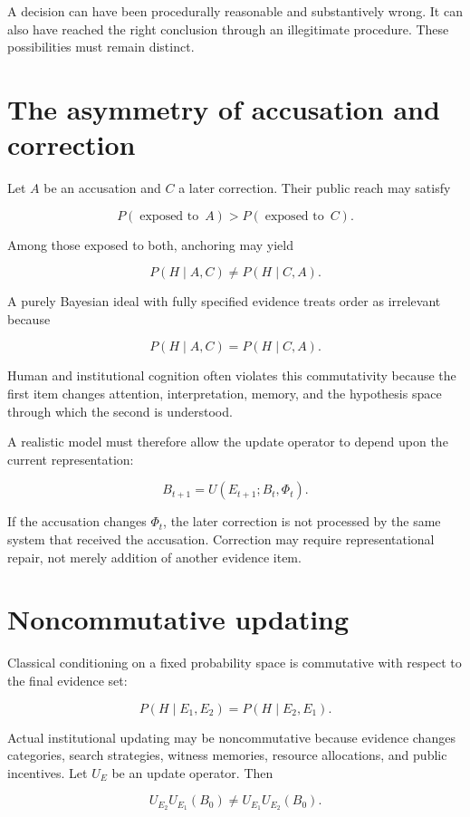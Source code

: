 A decision can have been procedurally reasonable and substantively wrong. It can also have reached the right conclusion through an illegitimate procedure. These possibilities must remain distinct.

\section{The asymmetry of accusation and correction}
\label{sec:a60}

Let \(A\) be an accusation and \(C\) a later correction. Their public reach may satisfy

\[
P(\operatorname{exposed\ to}\ A)
>
P(\operatorname{exposed\ to}\ C).
\]

Among those exposed to both, anchoring may yield

\[
P(H\mid A,C)
\neq
P(H\mid C,A).
\]

A purely Bayesian ideal with fully specified evidence treats order as irrelevant because

\[
P(H\mid A,C)
=
P(H\mid C,A).
\]

Human and institutional cognition often violates this commutativity because the first item changes attention, interpretation, memory, and the hypothesis space through which the second is understood.

A realistic model must therefore allow the update operator to depend upon the current representation:

\[
B_{t+1}
=
U(E_{t+1};B_t,\Phi_t).
\]

If the accusation changes \(\Phi_t\), the later correction is not processed by the same system that received the accusation. Correction may require representational repair, not merely addition of another evidence item.

\section{Noncommutative updating}
\label{sec:a61}

Classical conditioning on a fixed probability space is commutative with respect to the final evidence set:

\[
P(H\mid E_1,E_2)
=
P(H\mid E_2,E_1).
\]

Actual institutional updating may be noncommutative because evidence changes categories, search strategies, witness memories, resource allocations, and public incentives. Let \(U_{E}\) be an update operator. Then

\[
U_{E_2}U_{E_1}(B_0)
\neq
U_{E_1}U_{E_2}(B_0).
\]


